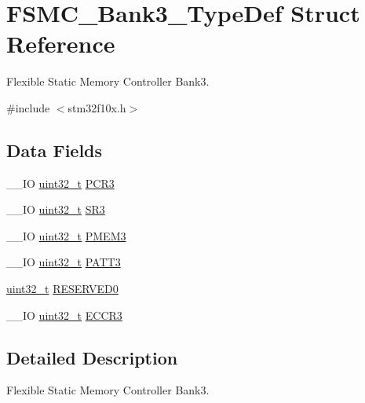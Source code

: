 \hypertarget{struct_f_s_m_c___bank3___type_def}{\section{F\-S\-M\-C\-\_\-\-Bank3\-\_\-\-Type\-Def Struct Reference}
\label{struct_f_s_m_c___bank3___type_def}
}


Flexible Static Memory Controller Bank3.  




{\ttfamily \#include $<$stm32f10x.\-h$>$}

\subsection*{Data Fields}
\begin{DoxyCompactItemize}
\item 
\-\_\-\-\_\-\-I\-O \hyperlink{stdint_8h_a435d1572bf3f880d55459d9805097f62}{uint32\-\_\-t} \hyperlink{struct_f_s_m_c___bank3___type_def_a1f772e1028641cab7b923bf02115b919}{P\-C\-R3}
\item 
\-\_\-\-\_\-\-I\-O \hyperlink{stdint_8h_a435d1572bf3f880d55459d9805097f62}{uint32\-\_\-t} \hyperlink{struct_f_s_m_c___bank3___type_def_ab89f16f64018a1f1e55d36f92b84be94}{S\-R3}
\item 
\-\_\-\-\_\-\-I\-O \hyperlink{stdint_8h_a435d1572bf3f880d55459d9805097f62}{uint32\-\_\-t} \hyperlink{struct_f_s_m_c___bank3___type_def_a756258d9266b1eee3455bc850107beb6}{P\-M\-E\-M3}
\item 
\-\_\-\-\_\-\-I\-O \hyperlink{stdint_8h_a435d1572bf3f880d55459d9805097f62}{uint32\-\_\-t} \hyperlink{struct_f_s_m_c___bank3___type_def_a0cbf1b4647f98914238202828de47416}{P\-A\-T\-T3}
\item 
\hyperlink{stdint_8h_a435d1572bf3f880d55459d9805097f62}{uint32\-\_\-t} \hyperlink{struct_f_s_m_c___bank3___type_def_a2e9cac528ee7bfce11b0b9a36db3b954}{R\-E\-S\-E\-R\-V\-E\-D0}
\item 
\-\_\-\-\_\-\-I\-O \hyperlink{stdint_8h_a435d1572bf3f880d55459d9805097f62}{uint32\-\_\-t} \hyperlink{struct_f_s_m_c___bank3___type_def_a6935beb5bbc2de668024c1989eecd46c}{E\-C\-C\-R3}
\end{DoxyCompactItemize}


\subsection{Detailed Description}
Flexible Static Memory Controller Bank3. 

